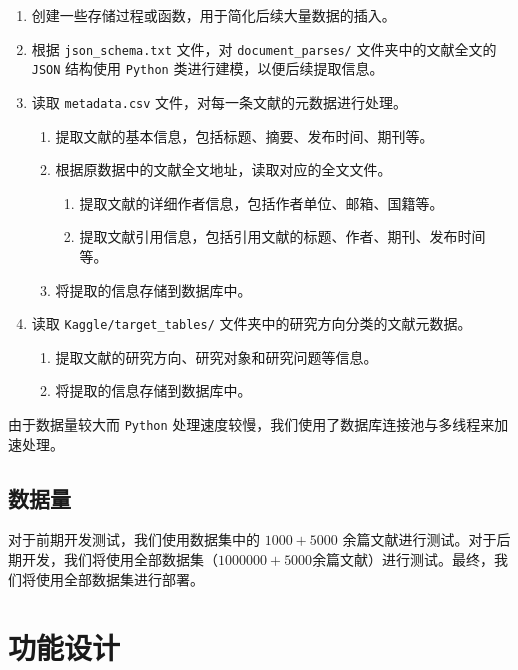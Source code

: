 \documentclass[UTF8,openany]{ctexbook}
\begin{document}
\begin{enumerate}
    \item 创建一些存储过程或函数，用于简化后续大量数据的插入。
    \item 根据 \texttt{json\_schema.txt} 文件，对 \texttt{document\_parses/} 文件夹中的文献全文的 \texttt{JSON} 结构使用 \texttt{Python} 类进行建模，以便后续提取信息。
    \item 读取 \texttt{metadata.csv} 文件，对每一条文献的元数据进行处理。
    \begin{enumerate}
        \item 提取文献的基本信息，包括标题、摘要、发布时间、期刊等。
        \item 根据原数据中的文献全文地址，读取对应的全文文件。
        
        \begin{enumerate}
            \item 提取文献的详细作者信息，包括作者单位、邮箱、国籍等。
            \item 提取文献引用信息，包括引用文献的标题、作者、期刊、发布时间等。
        \end{enumerate}

        \item 将提取的信息存储到数据库中。
    \end{enumerate}
    \item 读取 \texttt{Kaggle/target\_tables/} 文件夹中的研究方向分类的文献元数据。
    
    \begin{enumerate}
        \item 提取文献的研究方向、研究对象和研究问题等信息。
        \item 将提取的信息存储到数据库中。
    \end{enumerate}
\end{enumerate}

由于数据量较大而 \texttt{Python} 处理速度较慢，我们使用了数据库连接池与多线程来加速处理。

\section{数据量}

对于前期开发测试，我们使用数据集中的 $1000+5000$ 余篇文献进行测试。对于后期开发，我们将使用全部数据集（$1000000+5000$余篇文献）进行测试。最终，我们将使用全部数据集进行部署。

\chapter{功能设计}
\end{document}
